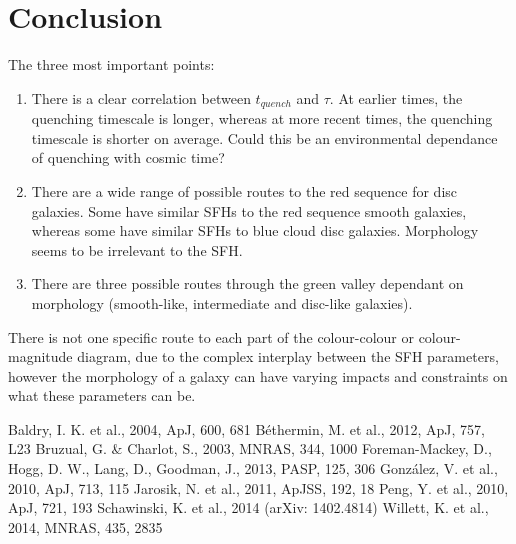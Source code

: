 \documentclass{mn2e}
\begin{document}
\section{Conclusion}\label{conc}
The three most important points: 
\begin{enumerate}
\item There is a clear correlation between $t_{quench}$ and $\tau$. At earlier times, the quenching timescale is longer, whereas at more recent times, the quenching timescale is shorter on average. Could this be an environmental dependance of quenching with cosmic time?
\item There are a wide range of possible routes to the red sequence for disc galaxies. Some have similar SFHs to the red sequence smooth galaxies, whereas some have similar SFHs to blue cloud disc galaxies. Morphology seems to be irrelevant to the SFH. 
\item There are three possible routes through the green valley dependant on morphology (smooth-like, intermediate and disc-like galaxies).
\end{enumerate}

There is not one specific route to each part of the colour-colour or colour-magnitude diagram, due to the complex interplay between the SFH parameters, however the morphology of a galaxy can have varying impacts and constraints on what these parameters can be.

\begin{thebibliography}{}
 Baldry, I. K. et al., 2004, ApJ, 600, 681
 B\'ethermin, M. et al., 2012, ApJ, 757, L23
 Bruzual, G. \& Charlot, S., 2003, MNRAS, 344, 1000
 Foreman-Mackey, D., Hogg, D. W., Lang, D., Goodman, J., 2013, PASP, 125, 306
 Gonz\'alez, V. et al., 2010, ApJ, 713, 115
 Jarosik, N. et al., 2011, ApJSS, 192, 18
 Peng, Y. et al., 2010, ApJ, 721, 193
 Schawinski, K. et al., 2014 (arXiv: 1402.4814)
 Willett, K. et al., 2014, MNRAS, 435, 2835
\end{thebibliography}
\end{document}
